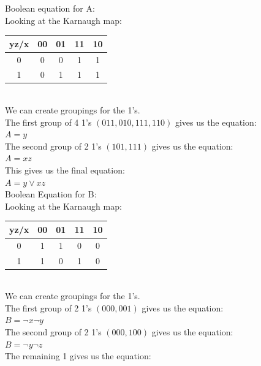 \documentclass{article}
\begin{document}
 {
     Boolean equation for A: \\
     Looking at the Karnaugh map: \\
     \begin{tabular}{| c | c | c | c | c |}
          \hline
          yz/x & 00 & 01 & 11 & 10 \\
          \hline
          0 & 0 & 0 & 1 & 1 \\
          \hline
          1 & 0 & 1 & 1 & 1 \\
          \hline
     \end{tabular} \\
     \linebreak
     We can create groupings for the 1's.\\
     The first group of 4 1's $(011, 010, 111, 110)$ gives us the equation: \\
     $A = y$ \\
     The second group of 2 1's $(101, 111)$ gives us the equation: \\
     $A = xz$ \\
     This gives us the final equation: \\
     $A = y \lor xz$ \\
     \linebreak
     Boolean Equation for B: \\
     Looking at the Karnaugh map: \\
     \begin{tabular}{| c | c | c | c | c |}
          \hline
          yz/x & 00 & 01 & 11 & 10 \\
          \hline
          0 & 1 & 1 & 0 & 0 \\
          \hline
          1 & 1 & 0 & 1 & 0 \\
          \hline
     \end{tabular} \\
     \linebreak
     We can create groupings for the 1's. \\
     The first group of 2 1's $(000, 001)$ gives us the equation: \\
     $B = \neg x \neg y$ \\
     The second group of 2 1's $(000, 100)$ gives us the equation: \\
     $B = \neg y \neg z$ \\
     The remaining 1 gives us the equation: \\
}
\end{document}
